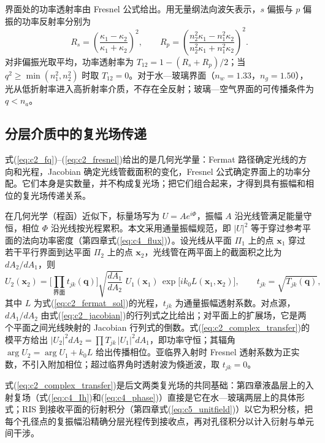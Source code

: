 界面处的功率透射率由 Fresnel 公式给出。用无量纲法向波矢表示，$s$ 偏振与 $p$ 偏振的功率反射率分别为
\begin{equation}
R_s=\left(\frac{\kappa_1-\kappa_2}{\kappa_1+\kappa_2}\right)^2,\qquad
R_p=\left(\frac{n_2^2\kappa_1-n_1^2\kappa_2}{n_2^2\kappa_1+n_1^2\kappa_2}\right)^2.
\label{eq:c2_fresnel}
\end{equation}
对非偏振光取平均，功率透射率为 $T_{12}=1-(R_s+R_p)/2$；当 $q^2\ge\min(n_1^2,n_2^2)$ 时取 $T_{12}=0$。对于水—玻璃界面（$n_w=1.33$，$n_g=1.50$），光从低折射率进入高折射率介质，不存在全反射；玻璃—空气界面的可传播条件为 $q<n_a$。

\subsection{分层介质中的复光场传递}
\label{sec:c2_complex_transfer}

式(\ref{eq:c2_fq})--(\ref{eq:c2_fresnel})给出的是几何光学量：Fermat 路径确定光线的方向和光程，Jacobian 确定光线管截面积的变化，Fresnel 公式确定界面上的功率分配。它们本身是实数量，并不构成复光场；把它们组合起来，才得到具有振幅和相位的复光场传递关系。

在几何光学（程函）近似下，标量场写为 $U=Ae^{i\Phi}$，振幅 $A$ 沿光线管满足能量守恒，相位 $\Phi$ 沿光线按光程累积。本文采用通量振幅规范，即 $|U|^2$ 等于穿过参考平面的法向功率密度（第四章式(\ref{eq:c4_flux})）。设光线从平面 $\Pi_1$ 上的点 $\mathbf x_1$ 穿过若干平行界面到达平面 $\Pi_2$ 上的点 $\mathbf x_2$，光线管在两平面上的截面积之比为 $dA_2/dA_1$，则
\begin{equation}
U_2(\mathbf x_2)=\Big[\prod_{\text{界面}}t_{jk}(\mathbf q)\Big]\sqrt{\frac{dA_1}{dA_2}}\;U_1(\mathbf x_1)\,\exp\!\big[ik_0L(\mathbf x_1,\mathbf x_2)\big],\qquad
t_{jk}=\sqrt{T_{jk}(\mathbf q)},
\label{eq:c2_complex_transfer}
\end{equation}
其中 $L$ 为式(\ref{eq:c2_fermat_sol})的光程，$t_{jk}$ 为通量振幅透射系数。对点源，$dA_1/dA_2$ 由式(\ref{eq:c2_jacobian})的行列式之比给出；对平面上的扩展场，它是两个平面之间光线映射的 Jacobian 行列式的倒数。式(\ref{eq:c2_complex_transfer})的模平方给出 $|U_2|^2dA_2=\prod T_{jk}\,|U_1|^2dA_1$，即功率守恒；其辐角 $\arg U_2=\arg U_1+k_0L$ 给出传播相位。亚临界入射时 Fresnel 透射系数为正实数，不引入附加相位；超过临界角时透射波为倏逝波，取 $t_{jk}=0$。

式(\ref{eq:c2_complex_transfer})是后文两类复光场的共同基础：第四章液晶层上的入射复场（式(\ref{eq:c4_Ih})和(\ref{eq:c4_phase})）直接是它在水—玻璃两层上的具体形式；RIS 到接收平面的衍射积分（第四章式(\ref{eq:c5_unitfield})）以它为积分核，把每个孔径点的复振幅沿精确分层光程传到接收点，再对孔径积分以计入衍射与单元间干涉。

